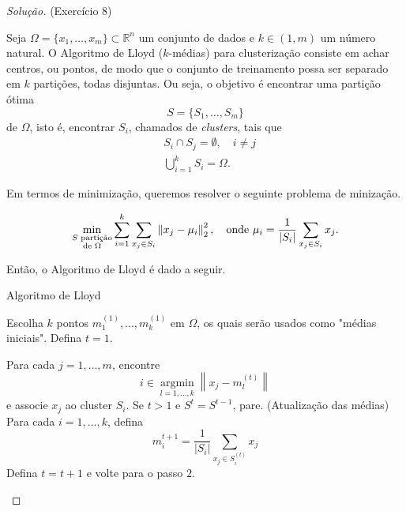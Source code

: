 \documentclass[a4paper,10pt]{article}
\newenvironment{solution}
  {\begin{proof}[Solução]}
  {\end{proof}}
\newcommand{\norm}[1]{\left\lVert#1\right\rVert}
\DeclareMathOperator{\argmin}{argmin}
\begin{document}
  \begin{solution}{(Exercício 8)}

    Seja $\Omega = \{x_1,\dots,x_m\}\subset \mathbb{R}^n$ um conjunto de dados e
    $k\in(1,m)$ um número natural. O Algoritmo de Lloyd ($k$-médias) para clusterização
    consiste em achar centros, ou pontos, de modo que o conjunto de treinamento
    possa ser separado em $k$ partições, todas disjuntas.
    Ou seja, o objetivo é encontrar uma partição ótima
    \begin{equation*}
      S = \{S_1, \dots, S_m\}
    \end{equation*}
    de $\Omega$, isto é,  encontrar $S_i$, chamados de \emph{clusters}, tais que
    \begin{equation*}
      \begin{split}
        & S_i \cap S_j = \emptyset, \quad i\neq j \\
        & \bigcup_{i=1}^k S_i = \Omega.
      \end{split}
    \end{equation*}

    Em termos de minimização, queremos resolver o seguinte problema de minização.

    \begin{equation*}
      \min_{\substack{S \textnormal{ partição} \\ \textnormal{de } \Omega}}
      \sum_{i=1}^{k} \sum_{x_j \in S_i} \norm{x_j - \mu_i}_2^2,
      \quad \textnormal{onde }
      \mu_i = \frac{1}{|S_i|} \sum_{x_j \in S_i} x_j.
    \end{equation*}

    Então, o Algoritmo de Lloyd é dado a seguir.

    \begin{algorithm}[htb]
        \caption{Algoritmo de Lloyd}
        \begin{algorithmic}[1]
            \State Escolha $k$ pontos $m_1^{(1)}, \dots, m_k^{(1)}$ em $\Omega$, os quais
                    serão usados como "médias iniciais". Defina $t=1$.

            \State Para cada $j = 1, \dots, m$, encontre
                  \begin{equation*}
                      i \in  \underset{l=1,\dots,k}{\argmin} \norm{x_j - m_l^{(t)}}
                  \end{equation*}
                  e associe $x_j$ ao cluster $S_i$.
            \State Se $t>1$ e $S^{t} = S^{t-1}$, pare.
            \State (Atualização das médias) Para cada $i=1,\dots,k$, defina
                  \begin{equation*}
                    m_i^{t+1} = \frac{1}{|S_i|} \sum_{x_j \in S_i^{(t)}} x_j
                  \end{equation*}
            \State Defina $t=t+1$ e volte para o passo $2$.
        \end{algorithmic}
    \end{algorithm}

  \end{solution}
\end{document}
